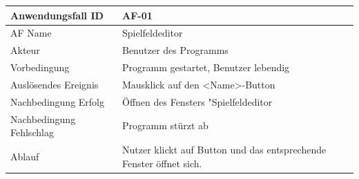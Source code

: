 \documentclass[11pt]{article}
\begin{document}
\pagebreak

\par

\begin{tabular}[m]{|m{7cm}|m{9cm}|}
    \hline
    Anwendungsfall ID     & AF-01 \\
         \hline
    AF Name     &  Spielfeldeditor \\
         \hline
    Akteur&Benutzer des Programms \\
    \hline
    Vorbedingung&Programm gestartet, Benutzer lebendig\\
    \hline
    Auslösendes Ereignis&Mausklick auf den <Name>-Button\\
    \hline
    Nachbedingung Erfolg&Öffnen des Fensters "Spielfeldeditor\\
    \hline
    Nachbedingung Fehlschlag&Programm stürzt ab\\
    \hline
    Ablauf&Nutzer klickt auf Button und das entsprechende Fenster öffnet sich.\\
    \hline
\end{tabular}
\par
\end{document}
